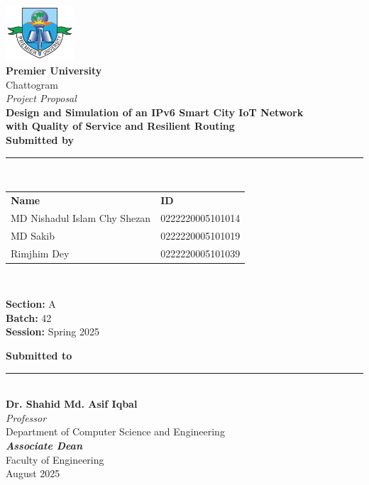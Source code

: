 \documentclass[12pt,a4paper]{article}
\begin{document}
\begin{titlepage}
    \begin{center}
        \vspace*{0.4cm}
        \includegraphics[width=0.19\textwidth]{Logo_of_Premier_University_(PU).png}\\[0.8cm]
        
        {\fontsize{28}{34}\selectfont \textbf{Premier University}}\\[0.15cm]
        {\fontsize{17}{21}\selectfont Chattogram}\\[0.6cm]

        {\Large \textit{Project Proposal}}\\[0.2cm]

        {\fontsize{18}{24}\selectfont \textbf{Design and Simulation of an IPv6 Smart City IoT Network}}\\[0.08cm]
        {\fontsize{13}{16}\selectfont \textbf{with Quality of Service and Resilient Routing}}\\[0.7cm]

        {\large \textbf{Submitted by}}\\[0.08cm]
\rule{0.21\textwidth}{0.7pt}\\[0.12cm]

\renewcommand{\arraystretch}{1.2}
\begin{tabular}{p{6.5cm} l}
    \textbf{Name} & \textbf{ID} \\
    MD Nishadul Islam Chy Shezan & 0222220005101014 \\
    MD Sakib & 0222220005101019 \\
    Rimjhim Dey & 0222220005101039 \\
\end{tabular}\\[0.6cm]

\begin{center}
    \textbf{Section:} A \\[0.1cm]
    \textbf{Batch:} 42 \\[0.1cm]
    \textbf{Session:} Spring 2025
\end{center}

        {\large \textbf{Submitted to}}\\[0.08cm]
        \rule{0.17\textwidth}{0.7pt}\\[0.11cm]
        {\textbf{Dr. Shahid Md. Asif Iqbal}}\\
        \textit{Professor}\\
        Department of Computer Science and Engineering\\
        \textbf{\textit{Associate Dean}}\\
        Faculty of Engineering\\[0.35cm]

        \vfill
        {\normalsize August 2025}
    \end{center}
\end{titlepage}
\end{document}
